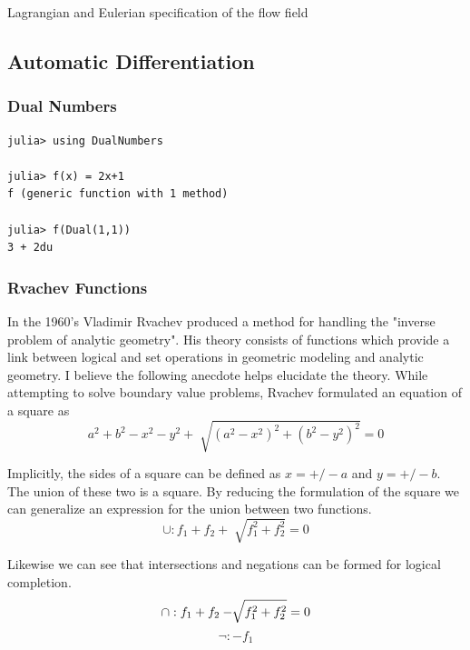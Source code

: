 \documentclass[a4paper]{article}
\begin{document}
Lagrangian and Eulerian specification of the flow field

\subsection{Automatic Differentiation}

\subsubsection{Dual Numbers}
\begin{lstlisting}
julia> using DualNumbers

julia> f(x) = 2x+1
f (generic function with 1 method)

julia> f(Dual(1,1))
3 + 2du
\end{lstlisting}


\subsubsection{Rvachev Functions}


In the 1960's Vladimir Rvachev produced a method for handling the "inverse
problem of analytic geometry". His theory consists of functions which provide a
link between logical and set operations in geometric modeling and analytic
geometry.\cite{shapiro1991theory} I believe the following anecdote helps
elucidate the theory. While attempting to solve boundary value problems,
Rvachev formulated an equation of a square as
\begin{equation*}
a^2 + b^2 − x^2 − y^2 + \sqrt[]{( a^2 − x^2 )^2 +( b^2 − y^2 )^2} =0
\end{equation*}

Implicitly, the sides of a square can be defined as $x= +/- a$ and $y= +/- b$.
The union of these two is a square. By reducing the formulation of the square
we can generalize an expression for the union between two functions.
\begin{equation*}
\cup : f_1 + f_2 + \sqrt[]{f_1^2 +f_2^2} =0
\end{equation*}

Likewise we can see that intersections and negations can be formed for logical
completion.
\begin{equation*}
\cap : f_1 + f_2 - \sqrt[]{f_1^2 +f_2^2} =0 \\
\end{equation*}
\begin{equation*}
\neg : -f_1
\end{equation*}
\end{document}

